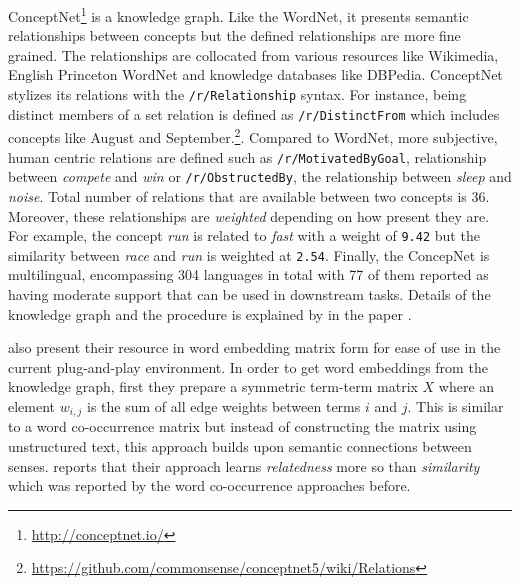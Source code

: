 ConceptNet\footnote{\url{http://conceptnet.io/}} is a knowledge graph.
Like the WordNet, it presents semantic relationships between concepts but the defined relationships are more fine grained.
The relationships are collocated from various resources like Wikimedia, English Princeton WordNet and knowledge databases like DBPedia.
ConceptNet stylizes its relations with the \texttt{/r/Relationship} syntax.
For instance, being distinct members of a set relation is defined as \texttt{/r/DistinctFrom} which includes concepts like August and September.\footnote{\url{https://github.com/commonsense/conceptnet5/wiki/Relations}}.
Compared to WordNet, more subjective, human centric relations are defined such as \texttt{/r/MotivatedByGoal}, relationship between \emph{compete} and \emph{win} or \texttt{/r/ObstructedBy}, the relationship between \emph{sleep} and \emph{noise}.
Total number of relations that are available between two concepts is 36.
Moreover, these relationships are \emph{weighted} depending on how present they are.
For example, the concept \emph{run} is related to \emph{fast} with a weight of \texttt{9.42} but the similarity between \emph{race} and \emph{run} is weighted at \texttt{2.54}.
Finally, the ConcepNet is multilingual, encompassing 304 languages in total with 77 of them reported as having moderate support that can be used in downstream tasks.
Details of the knowledge graph and the procedure is explained by \textcite{speer_conceptnet_2017} in the paper .

\citeauthor{speer_conceptnet_2017} also present their resource in word embedding matrix form for ease of use in the current plug-and-play environment.
In order to get word embeddings from the knowledge graph, first they prepare a symmetric term-term matrix $X$ where an element $w_{i,j}$ is the sum of all edge weights between terms $i$ and $j$.
This is similar to a word co-occurrence matrix but instead of constructing the matrix using unstructured text, this approach builds upon semantic connections between senses.
\citeauthor{speer_conceptnet_2017} reports that their approach learns \emph{relatedness} more so than \emph{similarity} which was reported by the word co-occurrence approaches before.

